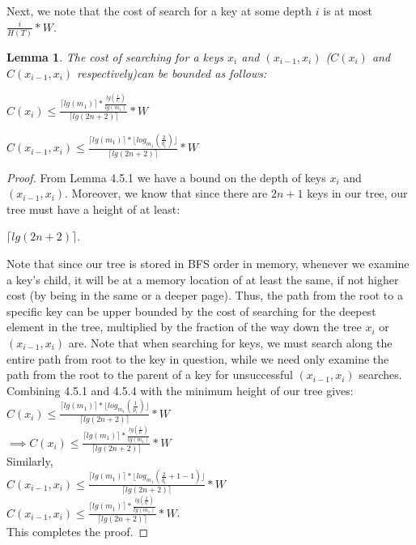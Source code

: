\documentclass[letterpaper,12pt,titlepage,oneside,final]{book}
\theoremstyle{plain}
\newtheorem{lem}[thm]{Lemma}
\begin{document}
Next, we note that the cost of search for a key at some depth $i$ is at most $\frac{i}{H(T)}* W$.

\begin{lem}
The cost of searching for a keys $x_i$ and $(x_{i-1},x_i)$ ($C(x_i)$ and $C(x_{i-1},x_i)$ respectively)can be bounded as follows: 

\begin{center} $C(x_i) \leq \frac{\lceil lg(m_1) \rceil * \frac{lg(\frac{1}{p_i})}{lg(m_1)}}{\lceil lg(2n+2) \rceil} * W$ 
\end{center}


\begin{center}
 $C(x_{i-1},x_i) \leq \frac{\lceil lg(m_1) \rceil * \lfloor log_{m_1}(\frac{2}{q_i}) \rfloor}{\lceil lg(2n+2) \rceil} * W$ 
 \end{center}
\end{lem}

\begin{proof}
From Lemma 4.5.1 we have a bound on the depth of keys $x_i$ and $(x_{i-1},x_i)$. Moreover, we know that since there are $2n+1$ keys in our tree, our tree must have a height of at least:
\begin{center}
 $\lceil lg(2n+2) \rceil$.
\end{center}
Note that since our tree is stored in BFS order in memory, whenever we examine a key's child, it will be at a memory location of at least the same, if not higher cost (by being in the same or a deeper page). Thus, the path from the root to a specific key can be upper bounded by the cost of searching for the deepest element in the tree, multiplied by the fraction of the way down the tree $x_i$ or $(x_{i-1},x_i)$ are. Note that when searching for keys, we must search along the entire path from root to the key in question, while we need only examine the path from the root to the parent of a key for unsuccessful $(x_{i-1},x_i)$ searches. Combining 4.5.1 and 4.5.4 with the minimum height of our tree gives: \\

 $C(x_i) \leq \frac{\lceil lg(m_1) \rceil * \lfloor log_{m_1}(\frac{1}{p_i}) \rfloor}{\lceil lg(2n+2) \rceil} * W$  \\
 $\implies C(x_i) \leq \frac{\lceil lg(m_1) \rceil * \frac{lg(\frac{1}{p_i})}{lg(m_1)}}{\lceil lg(2n+2) \rceil} * W$ \\
 
 Similarly, \\
 $C(x_{i-1},x_i) \leq \frac{\lceil lg(m_1) \rceil * \lfloor log_{m_1}(\frac{2}{q_i} + 1 - 1) \rfloor}{\lceil lg(2n+2) \rceil} * W$  \\
 $C(x_{i-1},x_i) \leq \frac{\lceil lg(m_1) \rceil * \frac{lg(\frac{2}{q_i})}{lg(m_1)}}{\lceil lg(2n+2) \rceil} * W$. \\ 
 
This completes the proof. 
 


\end{proof}
\end{document}
